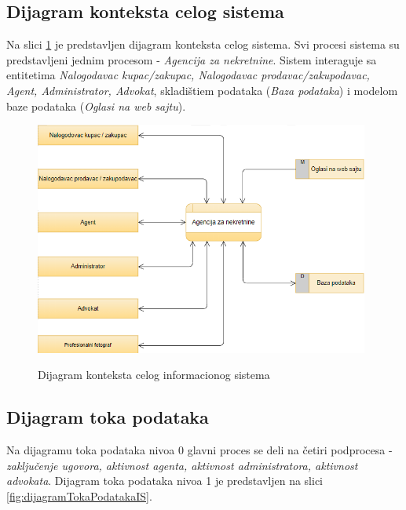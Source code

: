 \documentclass[20pt]{article}
\begin{document}
\newpage
\subsection{\bfseries \Large Dijagram konteksta celog sistema}
\setlength{\parindent}{1cm}
\fontsize{13}{18} \selectfont 

Na slici \ref{fig:dijagramKontekstaCelogIS} je predstavljen dijagram konteksta celog sistema. Svi procesi sistema su predstavljeni jednim procesom - {\it Agencija za nekretnine}. Sistem interaguje sa entitetima {\it Nalogodavac kupac/zakupac, Nalogodavac prodavac/zakupodavac, Agent, Administrator, Advokat}, skladi\v{s}tiem podataka ({\it Baza podataka}) i modelom baze podataka ({\it Oglasi na web sajtu}).

\begin{figure}[h]
        \centering
        \includegraphics[width=0.98\textwidth,height=0.5\textheight]{Pictures/DijagramKontekstaCelogSistema}\\
        \caption{Dijagram konteksta celog informacionog sistema}
        \label{fig:dijagramKontekstaCelogIS}
    \end{figure}

\newpage
\subsection{\bfseries \Large Dijagram toka podataka}
\setlength{\parindent}{1cm}
\fontsize{13}{18} \selectfont 

Na dijagramu toka podataka nivoa 0 glavni proces se deli na \v{c}etiri podprocesa - {\it zaključenje ugovora, aktivnost agenta, aktivnost administratora, aktivnost advokata}.
Dijagram toka podataka nivoa 1 je predstavljen na slici \ref{fig:dijagramTokaPodatakaIS}. 
\end{document}

